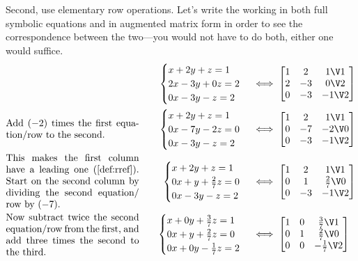 \begin{example}
\begin{solution}
Second, use elementary row operations.
Let's write the working in both full symbolic equations and in augmented matrix form in order to see the correspondence between the two---you would not have to do both, either one would suffice.
\begin{align*}&&
\begin{cases}
x+2y+z=1\\ 2x-3y+0z=2\\ 0x-3y-z=2
\end{cases}
&\iff %
\begin{bmatrix} 1&2&1\V1\\2&-3&0\V2\\0&-3&-1\V2 \end{bmatrix}
\\[0ex plus 1ex]&
\parbox{0.4\linewidth}{Add \((-2)\) times the first equation\slash row to the second.}
\quad&
\begin{cases}
x+2y+z=1\\ 0x-7y-2z=0\\ 0x-3y-z=2
\end{cases}
&\iff %
\begin{bmatrix} 1&2&1\V1\\0&-7&-2\V0\\0&-3&-1\V2 \end{bmatrix}
\\[0ex plus 1ex]&
\parbox{0.4\linewidth}{This makes the first column have a leading one (\cref{def:rref}).  Start on the second column by dividing the second equation\slash row by~\((-7)\).}
\quad&
\begin{cases}
x+2y+z=1\\ 0x+y+\frac27z=0\\ 0x-3y-z=2
\end{cases}
&\iff %
\begin{bmatrix} 1&2&1\V1\\0&1&\frac27\V0\\0&-3&-1\V2 \end{bmatrix}
\\[0ex plus 1ex]&
\parbox{0.4\linewidth}{Now subtract twice the second equation\slash row from the first, and add three times the second to the third.}
\quad&
\begin{cases}
x+0y+\frac37z=1\\ 0x+y+\frac27z=0\\ 0x+0y-\frac17z=2
\end{cases}
&\iff %
\begin{bmatrix} 1&0&\frac37\V1\\0&1&\frac27\V0\\0&0&-\frac17\V2 \end{bmatrix}

\end{align*}
\end{solution}
\end{example}
